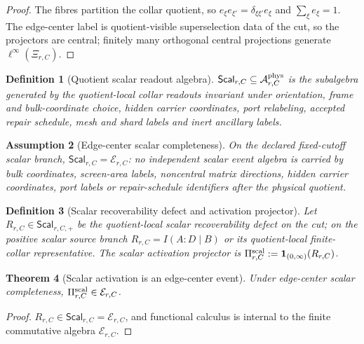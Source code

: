\documentclass[11pt]{article}
\newtheorem{theorem}{Theorem}[section]
\newtheorem{definition}[theorem]{Definition}
\newtheorem{assumption}[theorem]{Assumption}
\theoremstyle{remark}
\theoremstyle{plain}
\begin{document}
\begin{proof}
The fibres partition the collar quotient, so
\(e_{\xi}e_{\xi'}=\delta_{\xi\xi'}e_\xi\) and \(\sum_\xi e_\xi=1\). The
edge-center label is quotient-visible superselection data of the cut, so the
projectors are central; finitely many orthogonal central projections
generate \(\ell^\infty(\Xi_{r,C})\).
\end{proof}

\begin{definition}[Quotient scalar readout algebra]
\label{def:quotient-scalar-readout-algebra}
\(\mathsf{Scal}_{r,C}\subseteq\mathcal A^{\rm phys}_{r,C}\) is the subalgebra
generated by the quotient-local collar readouts invariant under orientation,
frame and bulk-coordinate choice, hidden carrier coordinates, port
relabeling, accepted repair schedule, mesh and shard labels and inert
ancillary labels.
\end{definition}

\begin{assumption}[Edge-center scalar completeness]
\label{ass:edge-center-scalar-completeness}
On the declared fixed-cutoff scalar branch,
\(\mathsf{Scal}_{r,C}=\mathcal E_{r,C}\): no independent scalar event algebra
is carried by bulk coordinates, screen-area labels, noncentral matrix
directions, hidden carrier coordinates, port labels or repair-schedule
identifiers after the physical quotient.
\end{assumption}

\begin{definition}[Scalar recoverability defect and activation projector]
\label{def:scalar-activation-projector}
Let \(R_{r,C}\in\mathsf{Scal}_{r,C,+}\) be the quotient-local scalar
recoverability defect on the cut; on the positive scalar source branch
\(R_{r,C}=I(A:D\mid B)\) or its quotient-local finite-collar representative.
The scalar activation projector is
\(\Pi^{\rm scal}_{r,C}:=\mathbf 1_{(0,\infty)}(R_{r,C})\).
\end{definition}

\begin{theorem}[Scalar activation is an edge-center event]
\label{thm:scalar-activation-edge-center}
Under edge-center scalar completeness, \(\Pi^{\rm scal}_{r,C}\in\mathcal E_{r,C}\).
\end{theorem}

\begin{proof}
\(R_{r,C}\in\mathsf{Scal}_{r,C}=\mathcal E_{r,C}\), and functional calculus is
internal to the finite commutative algebra \(\mathcal E_{r,C}\).
\end{proof}
\end{document}
